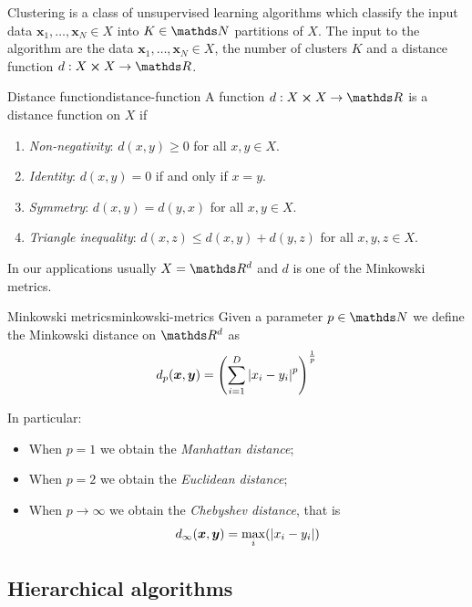 \documentclass[12pt]{extarticle}
\renewcommand{\vec}[1]{\bm{#1}}
\begin{document}
Clustering is a class of unsupervised learning algorithms which classify the input data
$\vec x_1, \dots, \vec x_N \in X$ into $K \in \N$ partitions of $X$.
The input to the algorithm are the data $\vec x_1, \dots, \vec x_N \in X$, the number of clusters
$K$ and a distance function $d: X \cross X \to \R$.


\begin{definition}{Distance function}{distance-function}
	A function $d: X \cross X \to \R$ is a distance function on $X$ if
	\begin{enumerate}[label=\roman*.]
		\item \emph{Non-negativity}: $d(x, y) \geq 0$ for all $x, y \in X$.
		\item \emph{Identity}: $d(x, y) = 0$ if and only if $x = y$.
		\item \emph{Symmetry}: $d(x, y) = d(y, x)$ for all $x, y \in X$.
		\item \emph{Triangle inequality}: $d(x, z) \leq d(x, y) + d(y, z)$ for all $x, y, z \in X$.
	\end{enumerate}
\end{definition}

In our applications usually $X = \R^d$ and $d$ is one of the Minkowski metrics.

\begin{definition}{Minkowski metrics}{minkowski-metrics}
	Given a parameter $p \in \N$ we define the Minkowski distance on $\R^d$ as
	\begin{equation}
		d_p(\vec x, \vec y) = \left( \sum_{i = 1}^D \abs{x_i - y_i}^p\right)^{\frac{1}{p}}
	\end{equation}

	In particular:
	\begin{itemize}
		\item When $p = 1$ we obtain the \emph{Manhattan distance};
		\item When $p = 2$ we obtain the \emph{Euclidean distance};
		\item When $p \to \infty$ we obtain the \emph{Chebyshev distance}, that is
		      \begin{equation}
			      d_\infty(\vec x, \vec y) = \max_i (\abs{x_i - y_i})
		      \end{equation}
	\end{itemize}
\end{definition}

\subsection{Hierarchical algorithms}
\end{document}
